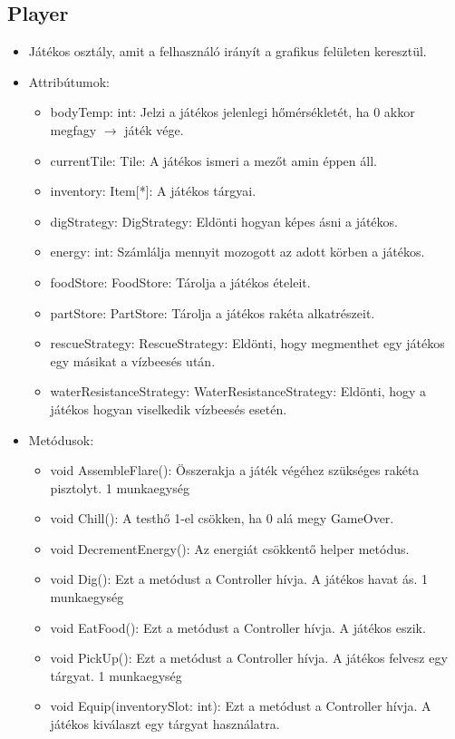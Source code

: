 \subsection{Player}
\begin{itemize}
	\item Játékos osztály, amit a felhasználó irányít a grafikus felületen keresztül.
	\item Attribútumok:
	\begin{itemize}
		\item bodyTemp: int: Jelzi a játékos jelenlegi hőmérsékletét, ha 0 akkor megfagy $\rightarrow$ játék vége.
		\item currentTile: Tile: A játékos ismeri a mezőt amin éppen áll.
		\item inventory: Item[*]: A játékos tárgyai.
		\item digStrategy: DigStrategy: Eldönti hogyan képes ásni a játékos.
		\item energy: int: Számlálja mennyit mozogott az adott körben a játékos.
		\item foodStore: FoodStore: Tárolja a játékos ételeit.
		\item partStore: PartStore: Tárolja a játékos rakéta alkatrészeit.
		\item rescueStrategy: RescueStrategy: Eldönti, hogy megmenthet egy játékos egy másikat a vízbeesés után.
		\item waterResistanceStrategy: WaterResistanceStrategy: Eldönti, hogy a játékos hogyan viselkedik vízbeesés esetén.
	\end{itemize}
	\item Metódusok:
	\begin{itemize}
		\item void AssembleFlare(): Összerakja a játék végéhez szükséges rakéta pisztolyt. 1 munkaegység
		\item void Chill(): A testhő 1-el csökken, ha 0 alá megy GameOver.
		\item void DecrementEnergy(): Az energiát csökkentő helper metódus.
		\item void Dig(): Ezt a metódust a Controller hívja. A játékos havat ás. 1 munkaegység
		\item void EatFood(): Ezt a metódust a Controller hívja. A játékos eszik.
		\item void PickUp(): Ezt a metódust a Controller hívja. A játékos felvesz egy tárgyat. 1 munkaegység
		\item void Equip(inventorySlot: int): Ezt a metódust a Controller hívja. A játékos kiválaszt egy tárgyat használatra.

\end{itemize}
\end{itemize}

